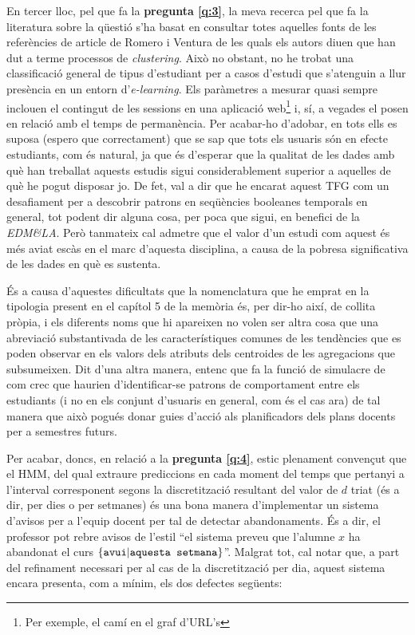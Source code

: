 \documentclass[
	a4paper,
	twoside,
	justified
]{tufte-handout}
\begin{document}
En tercer lloc, pel que fa la \textbf{pregunta \ref{q:3}}, la meva recerca pel que fa la literatura sobre la qüestió s'ha basat en consultar totes aquelles fonts de les referències de article de Romero i Ventura \citep{romero10} de les quals els autors diuen que han dut a terme processos de \emph{clustering}. Això no obstant, no he trobat una classificació general de tipus d'estudiant per a casos d'estudi que s'atenguin a llur presència en un entorn d'\emph{e-learning}. Els paràmetres a mesurar quasi sempre inclouen el contingut de les sessions en una aplicació web\footnote{Per exemple, el camí en el graf d'URL's} i, sí, a vegades el posen en relació amb el temps de permanència. Per acabar-ho d'adobar, en tots ells es suposa (espero que correctament) que se sap que tots els usuaris són en efecte estudiants, com és natural, ja que és d'esperar que la qualitat de les dades amb què han treballat aquests estudis sigui considerablement superior a aquelles de què he pogut disposar jo. De fet, val a dir que he encarat aquest TFG com un desafiament per a descobrir patrons en seqüències booleanes temporals en general, tot podent dir alguna cosa, per poca que sigui, en benefici de la \emph{EDM\&LA}. Però tanmateix cal admetre que el valor d'un estudi com aquest és més aviat escàs en el marc d'aquesta disciplina, a causa de la pobresa significativa de les dades en què es sustenta.

És a causa d'aquestes dificultats que la nomenclatura que he emprat en la tipologia present en el capítol 5 de la memòria és, per dir-ho així, de collita pròpia, i els diferents noms que hi apareixen no volen ser altra cosa que una abreviació substantivada de les característiques comunes de les tendències que es poden observar en els valors dels atributs dels centroides de les agregacions que subsumeixen. Dit d'una altra manera, entenc que fa la funció de simulacre de com crec que haurien d'identificar-se patrons de comportament entre els estudiants (i no en els conjunt d'usuaris en general, com és el cas ara) de tal manera que això pogués donar guies d'acció als planificadors dels plans docents per a semestres futurs. 

Per acabar, doncs, en relació a la \textbf{pregunta \ref{q:4}}, estic plenament convençut que el HMM, del qual extraure prediccions en cada moment del temps que pertanyi a l'interval corresponent segons la discretització resultant del valor de $d$ triat (és a dir, per dies o per setmanes) és una bona manera d'implementar un sistema d'avisos per a l'equip docent per tal de detectar abandonaments. És a dir, el professor pot rebre avisos de l'estil ``el sistema preveu que l'alumne $x$ ha abandonat el curs  $\{\texttt{avui}|\texttt{aquesta setmana}\}$''. Malgrat tot, cal notar que, a part del refinament necessari per al cas de la discretització per dia, aquest sistema encara presenta, com a mínim, els dos defectes següents:
\end{document}

